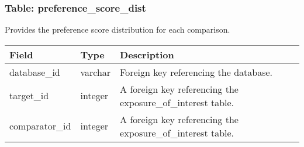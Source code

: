 \documentclass[
]{article}
\begin{document}
\hypertarget{table-preference_score_dist}{%
\subsubsection{Table:
preference\_score\_dist}\label{table-preference_score_dist}}

Provides the preference score distribution for each comparison.

\begin{longtable}[]{@{}lll@{}}
\toprule
\begin{minipage}[b]{0.23\columnwidth}\raggedright
Field\strut
\end{minipage} & \begin{minipage}[b]{0.18\columnwidth}\raggedright
Type\strut
\end{minipage} & \begin{minipage}[b]{0.50\columnwidth}\raggedright
Description\strut
\end{minipage}\tabularnewline
\midrule
\endhead
\begin{minipage}[t]{0.23\columnwidth}\raggedright
database\_id\strut
\end{minipage} & \begin{minipage}[t]{0.18\columnwidth}\raggedright
varchar\strut
\end{minipage} & \begin{minipage}[t]{0.50\columnwidth}\raggedright
Foreign key referencing the database.\strut
\end{minipage}\tabularnewline
\begin{minipage}[t]{0.23\columnwidth}\raggedright
target\_id\strut
\end{minipage} & \begin{minipage}[t]{0.18\columnwidth}\raggedright
integer\strut
\end{minipage} & \begin{minipage}[t]{0.50\columnwidth}\raggedright
A foreign key referencing the exposure\_of\_interest table.\strut
\end{minipage}\tabularnewline
\begin{minipage}[t]{0.23\columnwidth}\raggedright
comparator\_id\strut
\end{minipage} & \begin{minipage}[t]{0.18\columnwidth}\raggedright
integer\strut
\end{minipage} & \begin{minipage}[t]{0.50\columnwidth}\raggedright
A foreign key referencing the exposure\_of\_interest table.\strut
\end{minipage}\tabularnewline

\end{longtable}
\end{document}
